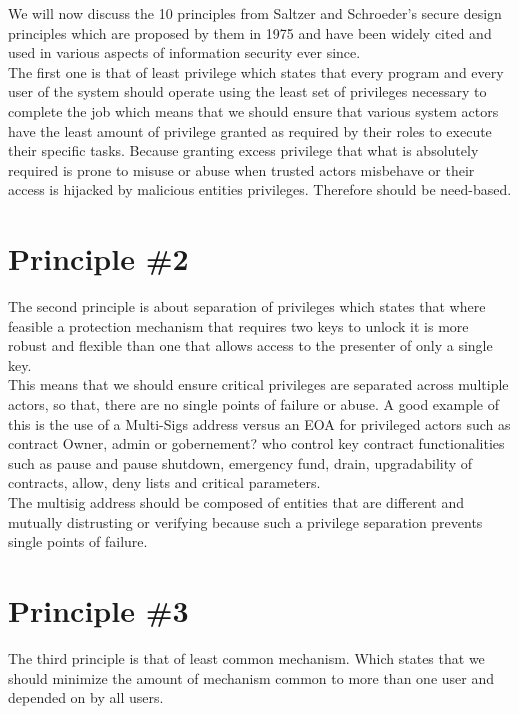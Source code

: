 We will now discuss the 10 principles from Saltzer and Schroeder's secure design principles which are proposed by them in 1975 and have been widely cited and used in various aspects of information security ever since.\\

The first one is that of least privilege which states that every program and every user of the system should operate using the least set of privileges necessary to complete the job which means that we should ensure that various system actors have the least amount of privilege granted as required by their roles to execute their specific tasks. Because granting excess privilege that what is absolutely required is prone to misuse or abuse when trusted actors misbehave or their access is hijacked by malicious entities privileges. Therefore should be need-based.

\section{Principle \#2}
The second principle is about separation of privileges which states that where feasible a protection mechanism that requires two keys to unlock it is more robust and flexible than one that allows access to the presenter of only a single key.\\

This means that we should ensure critical privileges are separated across multiple actors, so that, there are no single points of failure or abuse. A good example of this is the use of a Multi-Sigs address versus an EOA for privileged actors such as contract Owner, admin or gobernement? who control key contract functionalities such as pause and pause shutdown, emergency fund, drain, upgradability of contracts, allow, deny lists and critical parameters.\\

The multisig address should be composed of entities that are different and mutually distrusting or verifying because such a privilege separation prevents single points of failure.

\section{Principle \#3}

The third principle is that of least common mechanism. Which states that we should minimize the amount of mechanism common to more than one user and depended on by all users.\\

